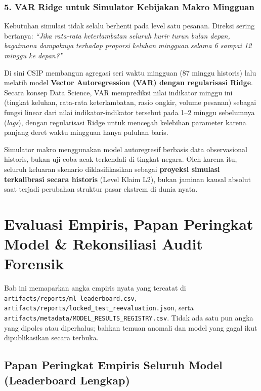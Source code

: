 \documentclass[11pt,a4paper,oneside]{book}
\newcommand{\code}[1]{{\small\nolinkurl{#1}}}
\begin{document}
\subsection{5. VAR Ridge untuk Simulator Kebijakan Makro Mingguan}
Kebutuhan simulasi tidak selalu berhenti pada level satu pesanan. Direksi sering bertanya: \emph{``Jika rata-rata keterlambatan seluruh kurir turun bulan depan, bagaimana dampaknya terhadap proporsi keluhan mingguan selama 6 sampai 12 minggu ke depan?''}

Di sini CSIP membangun agregasi seri waktu mingguan (87 minggu historis) lalu melatih model \textbf{Vector Autoregression (VAR) dengan regularisasi Ridge}. Secara konsep Data Science, VAR memprediksi nilai indikator minggu ini (tingkat keluhan, rata-rata keterlambatan, rasio ongkir, volume pesanan) sebagai fungsi linear dari nilai indikator-indikator tersebut pada 1--2 minggu sebelumnya (\emph{lags}), dengan regularisasi Ridge untuk mencegah kelebihan parameter karena panjang deret waktu mingguan hanya puluhan baris.

\begin{kejujuranbox}
Simulator makro menggunakan model autoregresif berbasis data observasional historis, bukan uji coba acak terkendali di tingkat negara. Oleh karena itu, seluruh keluaran skenario diklasifikasikan sebagai \textbf{proyeksi simulasi terkalibrasi secara historis} (Level Klaim L2), bukan jaminan kausal absolut saat terjadi perubahan struktur pasar ekstrem di dunia nyata.
\end{kejujuranbox}

\chapter{Evaluasi Empiris, Papan Peringkat Model \& Rekonsiliasi Audit Forensik}

Bab ini memaparkan angka empiris nyata yang tercatat di \code{artifacts/reports/ml_leaderboard.csv}, \code{artifacts/reports/locked_test_reevaluation.json}, serta \code{artifacts/metadata/MODEL_RESULTS_REGISTRY.csv}. Tidak ada satu pun angka yang dipoles atau diperhalus; bahkan temuan anomali dan model yang gagal ikut dipublikasikan secara terbuka.

\section{Papan Peringkat Empiris Seluruh Model (Leaderboard Lengkap)}
\end{document}
